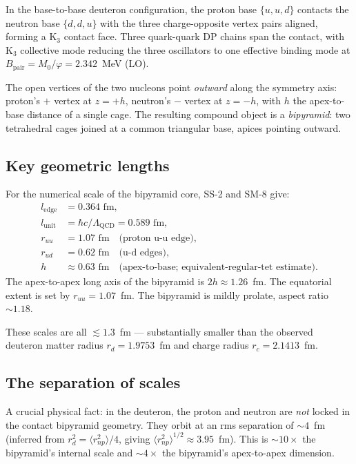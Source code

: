\documentclass[11pt,letterpaper]{article}
\newcommand{\phig}{\varphi}
\newcommand{\Mzero}{M_0}
\newcommand{\Bpair}{B_{\mathrm{pair}}}
\newcommand{\lunit}{l_{\mathrm{unit}}}
\newcommand{\ledge}{l_{\mathrm{edge}}}
\begin{document}
In the base-to-base deuteron configuration, the proton base $\{u, u, d\}$ contacts the neutron base $\{d, d, u\}$ with the three charge-opposite vertex pairs aligned, forming a K$_3$ contact face. Three quark-quark DP chains span the contact, with K$_3$ collective mode reducing the three oscillators to one effective binding mode at $\Bpair = \Mzero/\phig = 2.342$~MeV (LO).

The open vertices of the two nucleons point \emph{outward} along the symmetry axis: proton's $+$ vertex at $z = +h$, neutron's $-$ vertex at $z = -h$, with $h$ the apex-to-base distance of a single cage. The resulting compound object is a \emph{bipyramid}: two tetrahedral cages joined at a common triangular base, apices pointing outward.

\subsection{Key geometric lengths}

For the numerical scale of the bipyramid core, SS-2 \cite{abshier2026ss2} and SM-8 \cite{abshier2026sm8} give:
\begin{align*}
\ledge &= 0.364 \text{ fm}, \\
\lunit &= \hbar c / \Lambda_{\mathrm{QCD}} = 0.589 \text{ fm}, \\
r_{uu} &= 1.07 \text{ fm} \quad \text{(proton u-u edge)}, \\
r_{ud} &= 0.62 \text{ fm} \quad \text{(u-d edges)}, \\
h &\approx 0.63 \text{ fm} \quad \text{(apex-to-base; equivalent-regular-tet estimate)}.
\end{align*}
The apex-to-apex long axis of the bipyramid is $2h \approx 1.26$~fm. The equatorial extent is set by $r_{uu} = 1.07$~fm. The bipyramid is mildly prolate, aspect ratio ${\sim}1.18$.

These scales are all ${\lesssim}1.3$~fm --- substantially smaller than the observed deuteron matter radius $r_d = 1.9753$~fm and charge radius $r_c = 2.1413$~fm.

\subsection{The separation of scales}

A crucial physical fact: in the deuteron, the proton and neutron are \emph{not} locked in the contact bipyramid geometry. They orbit at an rms separation of ${\sim}4$~fm (inferred from $r_d^2 = \langle r_{np}^2 \rangle/4$, giving $\langle r_{np}^2 \rangle^{1/2} \approx 3.95$~fm). This is $\sim 10\times$ the bipyramid's internal scale and $\sim 4\times$ the bipyramid's apex-to-apex dimension.
\end{document}
